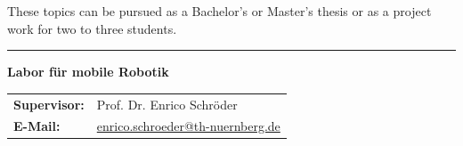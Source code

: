 \documentclass{ohm_project_description}
\begin{document}
\vspace{0.5cm}
These topics can be pursued as a Bachelor's or Master's thesis or as a project work for two to three students.


\vfill
\textcolor{ohm_red}{\rule{\linewidth}{0.4mm}}
\textbf{\textcolor{ohm_red}{Labor für mobile Robotik}} \\
\begin{tabular}{@{}ll}
\textbf{Supervisor:} & Prof. Dr. Enrico Schröder \\
\textbf{E-Mail:}   & \href{mailto:enrico.schroeder@th-nuernberg.de}{enrico.schroeder@th-nuernberg.de} \\
\end{tabular}
\end{document}
